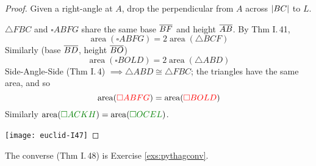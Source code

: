 \begin{proof}
Given a right-angle at $A$, drop the perpendicular from $A$ across $\left| BC\right|$ to $L$.\par
\begin{minipage}[t]{0.6\linewidth}\vspace{-5pt}
$\triangle FBC$ and $\square ABFG$ share the same base $\overline{BF}$ and height $\overline{AB}$. By Thm I.\,41,
\[\operatorname{area}(\square ABFG)=2\operatorname{area}(\triangle BCF)\]
Similarly (base $\overline{BD}$, height $\overline{BO}$)
\[\operatorname{area}(\square BOLD)=2\operatorname{area}(\triangle ABD)\]
Side-Angle-Side (Thm I.\,4) $\implies\triangle ABD\cong\triangle FBC$; the triangles have the same area, and so
\[\operatorname{area}(\textcolor{red}{\square ABFG})=\operatorname{area}(\textcolor{red}{\square BOLD})\]
Similarly $\operatorname{area}(\textcolor{Green}{\square ACKH})=\operatorname{area}(\textcolor{Green}{\square OCEL})$.
\end{minipage}\hfill
\begin{minipage}[t]{0.39\linewidth}\vspace{-12pt}
\texttt{[image: euclid-I47]}
\end{minipage}
\end{proof}

The converse (Thm I.\,48) is Exercise \ref{exs:pythagconv}.

\goodbreak\clearpage

